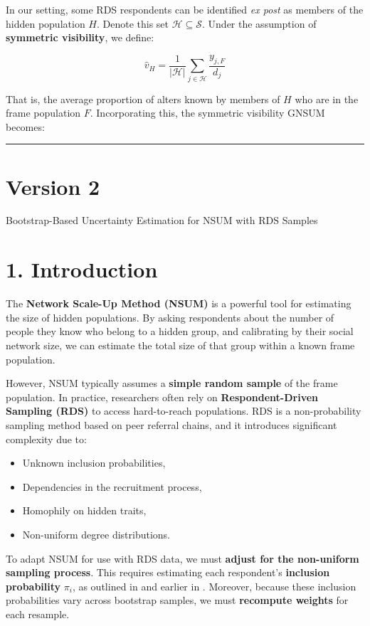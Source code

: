 \documentclass[
  12pt,
  letterpaper,
  DIV=11,
  numbers=noendperiod]{scrartcl}
\theoremstyle{plain}
\theoremstyle{definition}
\begin{document}
In our setting, some RDS respondents can be identified \emph{ex post} as
members of the hidden population \(H\). Denote this set
\(\mathcal{H} \subseteq \mathcal{S}\). Under the assumption of
\textbf{symmetric visibility}, we define:

\[
\hat{v}_{H} = \frac{1}{|\mathcal{H}|} \sum_{j \in \mathcal{H}} \frac{y_{j,F}}{d_j}
\]

That is, the average proportion of alters known by members of \(H\) who
are in the frame population \(F\). Incorporating this, the symmetric
visibility GNSUM becomes:

\begin{center}\rule{0.5\linewidth}{0.5pt}\end{center}

\section{Version 2}\label{version-2}

Bootstrap-Based Uncertainty Estimation for NSUM with RDS Samples

\section{1. Introduction}\label{introduction-2}

The \textbf{Network Scale-Up Method (NSUM)} is a powerful tool for
estimating the size of hidden populations. By asking respondents about
the number of people they know who belong to a hidden group, and
calibrating by their social network size, we can estimate the total size
of that group within a known frame population.

However, NSUM typically assumes a \textbf{simple random sample} of the
frame population. In practice, researchers often rely on
\textbf{Respondent-Driven Sampling (RDS)} to access hard-to-reach
populations. RDS is a non-probability sampling method based on peer
referral chains, and it introduces significant complexity due to:

\begin{itemize}
\item
  Unknown inclusion probabilities,
\item
  Dependencies in the recruitment process,
\item
  Homophily on hidden traits,
\item
  Non-uniform degree distributions.
\end{itemize}

To adapt NSUM for use with RDS data, we must \textbf{adjust for the
non-uniform sampling process}. This requires estimating each
respondent's \textbf{inclusion probability} \(\pi_i\), as outlined in
\textcite{feeh16-generaling} and earlier in \textcite{salf06-variance}.
Moreover, because these inclusion probabilities vary across bootstrap
samples, we must \textbf{recompute weights} for each resample.
\end{document}
